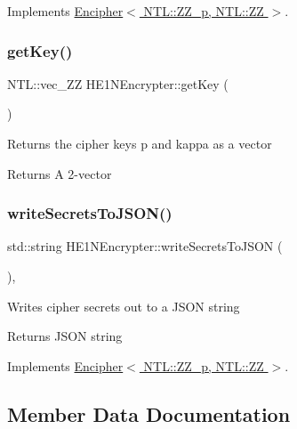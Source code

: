 Implements \hyperlink{classEncipher_aaf8138eb280608bfd03c6eb762ffc010}{Encipher$<$ N\+T\+L\+::\+Z\+Z\+\_\+p, N\+T\+L\+::\+Z\+Z $>$}.

\mbox{\label{classHE1NEncrypter_a68735a56be50d13e04824e48a61fc2f8}} 
\subsubsection{\texorpdfstring{get\+Key()}{getKey()}}
{\footnotesize\ttfamily N\+T\+L\+::vec\+\_\+\+ZZ H\+E1\+N\+Encrypter\+::get\+Key (\begin{DoxyParamCaption}{ }\end{DoxyParamCaption})}

Returns the cipher keys p and kappa as a vector \begin{DoxyReturn}{Returns}
A 2-\/vector 
\end{DoxyReturn}
\mbox{\label{classHE1NEncrypter_ad1bca3e0933b8e15b91d208e421f83b2}} 
\subsubsection{\texorpdfstring{write\+Secrets\+To\+J\+S\+O\+N()}{writeSecretsToJSON()}}
{\footnotesize\ttfamily std\+::string H\+E1\+N\+Encrypter\+::write\+Secrets\+To\+J\+S\+ON (\begin{DoxyParamCaption}{ }\end{DoxyParamCaption})\hspace{0.3cm}{\ttfamily [override]}, {\ttfamily [virtual]}}

Writes cipher secrets out to a J\+S\+ON string \begin{DoxyReturn}{Returns}
J\+S\+ON string 
\end{DoxyReturn}


Implements \hyperlink{classEncipher_a27d3efa1e364c1f0d7def65454c61b85}{Encipher$<$ N\+T\+L\+::\+Z\+Z\+\_\+p, N\+T\+L\+::\+Z\+Z $>$}.



\subsection{Member Data Documentation}
\mbox{\label{classHE1NEncrypter_a6ae3f5e69318587ba70afc87d21e6e11}} 
